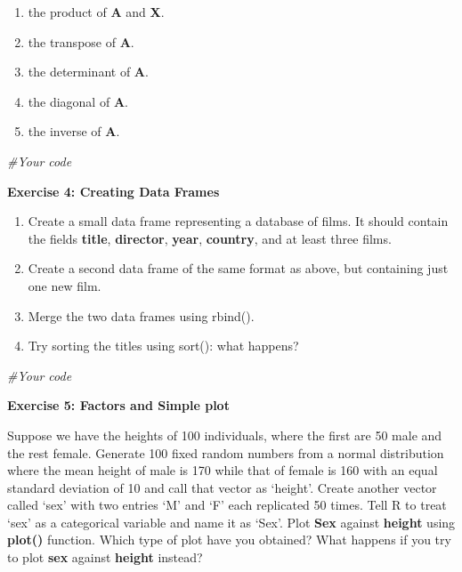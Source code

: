 \documentclass[
]{book}
\newenvironment{Shaded}{\begin{snugshade}}{\end{snugshade}}
\newcommand{\CommentTok}[1]{\textcolor[rgb]{0.56,0.35,0.01}{\textit{#1}}}
\begin{document}
\begin{enumerate}
\def\labelenumi{\roman{enumi})}
\item
  the product of \textbf{A} and \textbf{X}.
\item
  the transpose of \textbf{A}.
\item
  the determinant of \textbf{A}.
\item
  the diagonal of \textbf{A}.
\item
  the inverse of \textbf{A}.
\end{enumerate}

\begin{Shaded}
\begin{Highlighting}[]
\CommentTok{\#Your code}
\end{Highlighting}
\end{Shaded}

\textbf{Exercise 4: Creating Data Frames}

\begin{enumerate}
\def\labelenumi{(\alph{enumi})}
\item
  Create a small data frame representing a database of
  films. It should contain the fields \textbf{title}, \textbf{director}, \textbf{year}, \textbf{country}, and at least three films.
\item
  Create a second data frame of the same format as above, but containing just one new film.
\item
  Merge the two data frames using rbind().
\item
  Try sorting the titles using sort(): what happens?
\end{enumerate}

\begin{Shaded}
\begin{Highlighting}[]
\CommentTok{\#Your code}
\end{Highlighting}
\end{Shaded}

\textbf{Exercise 5: Factors and Simple plot}

Suppose we have the heights of 100 individuals, where the first are 50 male and the rest female. Generate 100 fixed random numbers from a normal distribution where the mean height of male is 170 while that of female is 160 with an equal standard deviation of 10 and call that vector as `height'. Create another vector called `sex' with two entries `M' and `F' each replicated 50 times. Tell R to treat `sex' as a categorical variable and name it as `Sex'. Plot \textbf{Sex} against \textbf{height} using \textbf{plot()} function. Which type of plot have you obtained? What happens if you try to plot \textbf{sex} against \textbf{height} instead?
\end{document}
